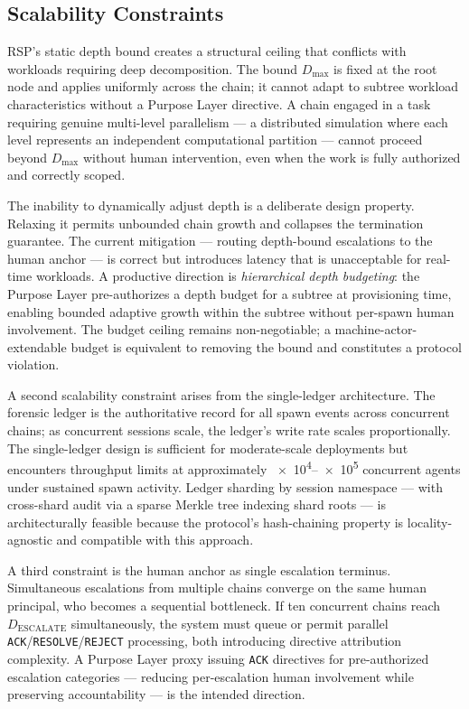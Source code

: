 \subsection{Scalability Constraints}
\label{sec:rs-scalability}

RSP's static depth bound creates a structural ceiling that conflicts with workloads requiring deep decomposition. The bound $D_{\max}$ is fixed at the root node and applies uniformly across the chain; it cannot adapt to subtree workload characteristics without a Purpose Layer directive. A chain engaged in a task requiring genuine multi-level parallelism --- a distributed simulation where each level represents an independent computational partition --- cannot proceed beyond $D_{\max}$ without human intervention, even when the work is fully authorized and correctly scoped.

The inability to dynamically adjust depth is a deliberate design property. Relaxing it permits unbounded chain growth and collapses the termination guarantee. The current mitigation --- routing depth-bound escalations to the human anchor --- is correct but introduces latency that is unacceptable for real-time workloads. A productive direction is \emph{hierarchical depth budgeting}: the Purpose Layer pre-authorizes a depth budget for a subtree at provisioning time, enabling bounded adaptive growth within the subtree without per-spawn human involvement. The budget ceiling remains non-negotiable; a machine-actor-extendable budget is equivalent to removing the bound and constitutes a protocol violation.

A second scalability constraint arises from the single-ledger architecture. The forensic ledger is the authoritative record for all spawn events across concurrent chains; as concurrent sessions scale, the ledger's write rate scales proportionally. The single-ledger design is sufficient for moderate-scale deployments but encounters throughput limits at approximately \numrange{e4}{e5} concurrent agents under sustained spawn activity. Ledger sharding by session namespace --- with cross-shard audit via a sparse Merkle tree indexing shard roots --- is architecturally feasible because the protocol's hash-chaining property is locality-agnostic and compatible with this approach.

A third constraint is the human anchor as single escalation terminus. Simultaneous escalations from multiple chains converge on the same human principal, who becomes a sequential bottleneck. If ten concurrent chains reach $D_{\text{ESCALATE}}$ simultaneously, the system must queue or permit parallel \texttt{ACK}/\texttt{RESOLVE}/\texttt{REJECT} processing, both introducing directive attribution complexity. A Purpose Layer proxy issuing \texttt{ACK} directives for pre-authorized escalation categories --- reducing per-escalation human involvement while preserving accountability --- is the intended direction.

